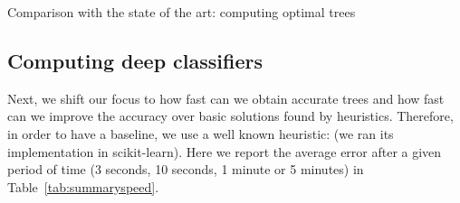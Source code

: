 \documentclass{llncs}
\begin{document}
%
%
%


% 


\begin{table}[htbp]
\begin{center}
\begin{footnotesize}
\tabcolsep=1.7pt

\end{footnotesize}
\end{center}
\caption{\label{tab:summaryacc} Comparison with the state of the art: computing optimal trees}
\end{table}


\subsection{Computing deep classifiers}

Next, we shift our focus to how fast can we obtain accurate trees and how fast can we improve the accuracy over basic solutions found by heuristics.
Therefore, in order to have a baseline, we use a well known heuristic: \cart (we ran its implementation in scikit-learn).
Here we report the average error after a given period of time (3 seconds, 10 seconds, 1 minute or 5 minutes) in Table~\ref{tab:summaryspeed}.


\medskip
\end{document}
